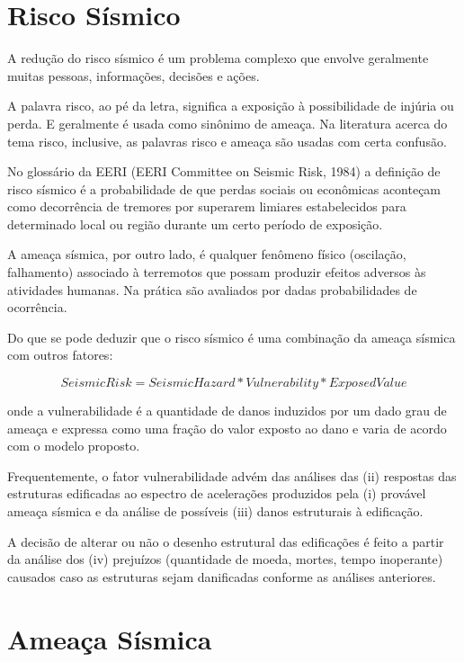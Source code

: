 \section{Risco Sísmico}
\label{sec:risco_sismico}

A redução do risco sísmico é um problema complexo que envolve geralmente muitas pessoas, informações, decisões e ações.

A palavra risco, ao pé da letra, significa a exposição à possibilidade de injúria ou perda. E geralmente é usada como
sinônimo de ameaça. Na literatura acerca do tema risco, inclusive, as palavras risco e ameaça são usadas com certa
confusão.

No glossário da EERI (EERI Committee on Seismic Risk, 1984) a definição de risco sísmico é a probabilidade de que
perdas sociais ou econômicas aconteçam como decorrência de tremores por superarem limiares estabelecidos para
determinado local ou região durante um certo período de exposição.

A ameaça sísmica, por outro lado, é qualquer fenômeno físico (oscilação, falhamento) associado à terremotos que possam
produzir efeitos adversos às atividades humanas. Na prática são avaliados por dadas probabilidades de ocorrência.

Do que se pode deduzir que o risco sísmico é uma combinação da ameaça sísmica com outros fatores:

\begin{equation}
		Seismic Risk = Seismic Hazard \ast Vulnerability \ast Exposed Value
	\label{eq:risk}
\end{equation}

onde a vulnerabilidade é a quantidade de danos induzidos por um dado grau de ameaça e expressa como uma fração do
valor exposto ao dano e varia de acordo com o modelo proposto.

Frequentemente, o fator vulnerabilidade advém das análises das (ii) respostas das estruturas edificadas ao espectro de
acelerações produzidos pela (i) provável ameaça sísmica e da análise de possíveis (iii) danos estruturais à edificação.

A decisão de alterar ou não o desenho estrutural das edificações é feito a partir da análise dos (iv) prejuízos
(quantidade de moeda, mortes, tempo inoperante) causados caso as estruturas sejam danificadas conforme as análises anteriores.


\section{Ameaça Sísmica}
\label{sec:ameaca_sismica}

